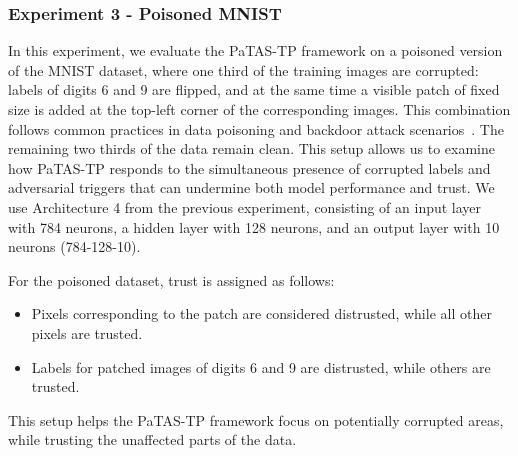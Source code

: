 \subsubsection{Experiment 3 - Poisoned MNIST}\label{exp:3}
In this experiment, we evaluate the \ac{PaTAS-TP} framework on a poisoned version of the MNIST dataset, where one third of the training images are corrupted: labels of digits 6 and 9 are flipped, and at the same time a visible patch of fixed size is added at the top-left corner of the corresponding images. This combination follows common practices in data poisoning and backdoor attack scenarios~\cite{chen2017targetedbackdoorattacksdeep}. The remaining two thirds of the data remain clean. This setup allows us to examine how \ac{PaTAS-TP} responds to the simultaneous presence of corrupted labels and adversarial triggers that can undermine both model performance and trust. We use Architecture 4 from the previous experiment, consisting of an input layer with 784 neurons, a hidden layer with 128 neurons, and an output layer with 10 neurons (784-128-10).

For the poisoned dataset, trust is assigned as follows:
\begin{itemize}
    \item Pixels corresponding to the patch are considered distrusted, while all other pixels are trusted.
    \item Labels for patched images of digits 6 and 9 are distrusted, while others are trusted.
\end{itemize}

\noindent This setup helps the \ac{PaTAS-TP} framework focus on potentially corrupted areas, while trusting the unaffected parts of the data.

